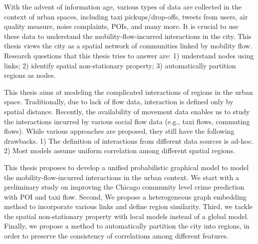 With the advent of information age, various types of data are collected in the context of urban spaces, including taxi pickups/drop-offs, tweets from users, air quality measure, noise complaints, POIs, and many more. It is crucial to use these data to understand the mobility-flow-incurred interactions in the city. This thesis views the city as a spatial network of communities linked by mobility flow. Research questions that this thesis tries to answer are: 1) understand nodes using links; 2) identify spatial non-stationary property; 3) automatically partition regions as nodes.

This thesis aims at modeling the complicated interactions of regions in the urban space. Traditionally, due to lack of flow data, interaction is defined only by spatial distance. Recently, the availability of movement data enables us to study the interactions incurred by various social flow data (e.g., taxi flows, commuting flows).  While various approaches are proposed, they still have the following drawbacks. 1) The definition of interactions from different data sources is ad-hoc. 2) Most models assume uniform correlation among different spatial regions.
 
This thesis proposes to develop a unified probabilistic graphical model to model the mobility-flow-incurred interactions in the urban context. We start with a preliminary study on improving the Chicago community level crime prediction with POI and taxi flow. Second, We propose a heterogeneous graph embedding method to incorporate various links and define region similarity. Third, we tackle the spatial non-stationary property with local models instead of a global model. Finally, we propose a method to automatically partition the city into regions, in order to preserve the consistency of correlations among different features.





